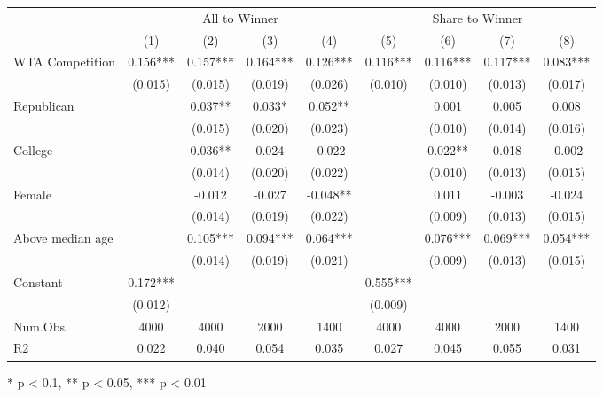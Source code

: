 \begin{table}[t]
\fontsize{12.0pt}{14.4pt}\selectfont
\begin{tabular*}{\linewidth}{@{\extracolsep{\fill}}lcccccccc}
\toprule
 & \multicolumn{4}{c}{All to Winner} & \multicolumn{4}{c}{Share to Winner} \\ 
\cmidrule(lr){2-5} \cmidrule(lr){6-9}
  & (1) & (2) & (3) & (4) & (5) & (6) & (7) & (8) \\ 
\midrule\addlinespace[2.5pt]
WTA Competition & 0.156*** & 0.157*** & 0.164*** & 0.126*** & 0.116*** & 0.116*** & 0.117*** & 0.083*** \\ 
 & (0.015) & (0.015) & (0.019) & (0.026) & (0.010) & (0.010) & (0.013) & (0.017) \\ 
Republican &  & 0.037** & 0.033* & 0.052** &  & 0.001 & 0.005 & 0.008 \\ 
 &  & (0.015) & (0.020) & (0.023) &  & (0.010) & (0.014) & (0.016) \\ 
College &  & 0.036** & 0.024 & -0.022 &  & 0.022** & 0.018 & -0.002 \\ 
 &  & (0.014) & (0.020) & (0.022) &  & (0.010) & (0.013) & (0.015) \\ 
Female &  & -0.012 & -0.027 & -0.048** &  & 0.011 & -0.003 & -0.024 \\ 
 &  & (0.014) & (0.019) & (0.022) &  & (0.009) & (0.013) & (0.015) \\ 
Above median age &  & 0.105*** & 0.094*** & 0.064*** &  & 0.076*** & 0.069*** & 0.054*** \\ 
 &  & (0.014) & (0.019) & (0.021) &  & (0.009) & (0.013) & (0.015) \\ 
Constant & 0.172*** &  &  &  & 0.555*** &  &  &  \\ 
{} & {(0.012)} & {} & {} & {} & {(0.009)} & {} & {} & {} \\ 
Num.Obs. & 4000 & 4000 & 2000 & 1400 & 4000 & 4000 & 2000 & 1400 \\ 
R2 & 0.022 & 0.040 & 0.054 & 0.035 & 0.027 & 0.045 & 0.055 & 0.031 \\ 
\bottomrule
\end{tabular*}
\begin{minipage}{\linewidth}
* p < 0.1, ** p < 0.05, *** p < 0.01\\
\end{minipage}
\end{table}

